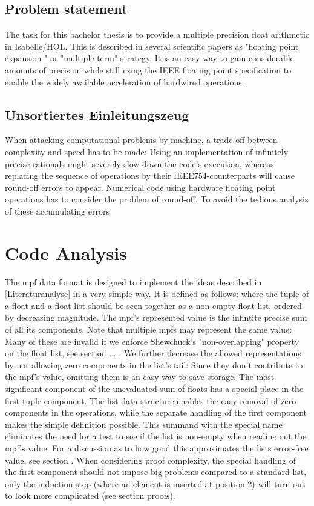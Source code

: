 \documentclass[11pt,a4paper]{article}
\begin{document}
\subsection{Problem statement}

The task for this bachelor thesis is to provide a multiple precision float arithmetic in Isabelle/HOL. This is described in several scientific papers as "floating point expansion " or "multiple term" strategy. It is an easy way to gain considerable amounts of precision while still using the IEEE floating point specification to enable the widely available acceleration of hardwired operations.

\subsection{Unsortiertes Einleitungszeug}

When attacking computational problems by machine, a trade-off between complexity and speed has to be made: Using an implementation of infinitely precise rationals might severely slow down the code's execution, whereas replacing the sequence of operations by their IEEE754-counterparts will cause round-off errors to appear. Numerical code using hardware floating point operations has to consider the problem of round-off. To avoid the tedious analysis of these accumulating errors

\section{Code Analysis}

The mpf data format is designed to implement the ideas described in [Literaturanalyse] in a very simple way. It is defined as follows:
\mpfdef
where the tuple of a float and a float list should be seen together as a non-empty float list, ordered by decreasing magnitude. The mpf's represented value is the infintite precise sum of all its components. Note that multiple mpfs may represent the same value:
Many of these are invalid if we enforce Shewchuck's "non-overlapping" property on the float list, see section ... . We further decrease the allowed representations by not allowing zero components in the list's tail: Since they don't contribute to the mpf's value, omitting them is an easy way to save storage.
The most significant component of the unevaluated sum of floats has a special place in the first tuple component. The list data structure enables the easy removal of zero components in the operations, while the separate handling of the first component makes the simple definition
\newline
\approxdef
\newline
possible. This summand with the special name \constapprox eliminates the need for a test to see if the list is non-empty when reading out the mpf's value. For a discussion as to how good this approximates the lists error-free value, see section     . When considering proof complexity, the special handling of the first component should not impose big problems compared to a standard list, only the induction step (where an element is inserted at position 2) will turn out to look more complicated (see section proofs).
\end{document}
